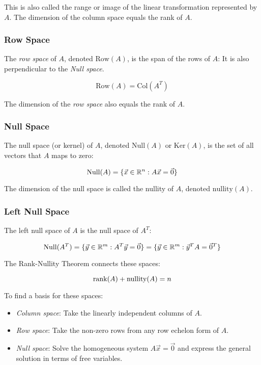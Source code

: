 This is also called the range or image of the linear transformation represented by \(A\). The dimension of the column space equals the rank of \(A\).

\subsubsection{Row Space}

The \emph{row space} of \(A\), denoted \(\text{Row}(A)\), is the span of the rows of \(A\):
 It is also perpendicular to the \emph{Null space}.

\[
    \text{Row}(A) = \text{Col}(A^T)
\]

The dimension of the \emph{row space} also equals the rank of \(A\).

\subsubsection{Null Space}

The null space (or kernel) of \(A\), denoted \(\text{Null}(A)\) or \(\text{Ker}(A)\), 
is the set of all vectors that \(A\) maps to zero:

\[
    \text{Null}(A) = \{\vec{x} \in \mathbb{R}^n : A\vec{x} = \vec{0}\}
\]

The dimension of the null space is called the nullity of \(A\), denoted \(\text{nullity}(A)\).

\subsubsection{Left Null Space}

The left null space of \(A\) is the null space of \(A^T\):

\[
    \text{Null}(A^T) = \{\vec{y} \in \mathbb{R}^m : A^T\vec{y} = \vec{0}\} = \{\vec{y} \in \mathbb{R}^m : \vec{y}^T A = \vec{0}^T\}
\]

The Rank-Nullity Theorem connects these spaces:

\[
    \text{rank}(A) + \text{nullity}(A) = n
\]

To find a basis for these spaces:

\begin{itemize}

    \item \emph{Column space}: Take the linearly independent columns of \(A\).

    \item \emph{Row space}: Take the non-zero rows from any row echelon form of \(A\).    

    \item \emph{Null space}: Solve the homogeneous system \(A\vec{x} = \vec{0}\) and express the general 
          solution in terms of free variables.
\end{itemize}

